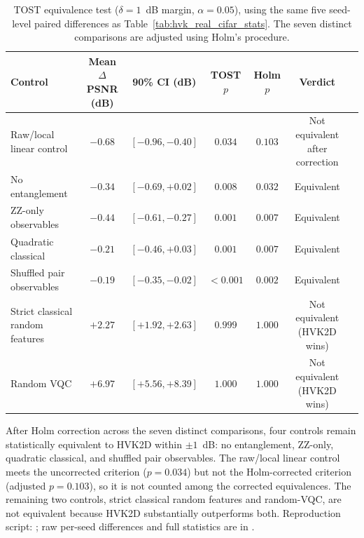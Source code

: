 \documentclass[11pt]{article}
\begin{document}
\begin{table}[H]
\centering
\caption{TOST equivalence test ($\delta=1$~dB margin, $\alpha=0.05$), using the same five seed-level paired differences as Table~\ref{tab:hvk_real_cifar_stats}. The seven distinct comparisons are adjusted using Holm’s procedure.}
\label{tab:tost_equivalence}
\scriptsize
\begin{tabular}{lcccccl}
\toprule
Control & Mean $\Delta$PSNR (dB) & 90\% CI (dB) & TOST $p$ & Holm $p$ & Verdict \\
\midrule
Raw/local linear control & $-0.68$ & $[-0.96,-0.40]$ & $0.034$ & $0.103$ & Not equivalent after correction \\
No entanglement & $-0.34$ & $[-0.69,+0.02]$ & $0.008$ & $0.032$ & Equivalent \\
ZZ-only observables & $-0.44$ & $[-0.61,-0.27]$ & $0.001$ & $0.007$ & Equivalent \\
Quadratic classical & $-0.21$ & $[-0.46,+0.03]$ & $0.001$ & $0.007$ & Equivalent \\
Shuffled pair observables & $-0.19$ & $[-0.35,-0.02]$ & $<0.001$ & $0.002$ & Equivalent \\
Strict classical random features & $+2.27$ & $[+1.92,+2.63]$ & $0.999$ & $1.000$ & Not equivalent (HVK2D wins) \\
Random VQC & $+6.97$ & $[+5.56,+8.39]$ & $1.000$ & $1.000$ & Not equivalent (HVK2D wins) \\
\bottomrule
\end{tabular}
\end{table}

After Holm correction across the seven distinct comparisons, four controls remain statistically equivalent to HVK2D within $\pm1$~dB: no entanglement, ZZ-only, quadratic classical, and shuffled pair observables. The raw/local linear control meets the uncorrected criterion ($p=0.034$) but not the Holm-corrected criterion (adjusted $p=0.103$), so it is not counted among the corrected equivalences. The remaining two controls, strict classical random features and random-VQC, are not equivalent because HVK2D substantially outperforms both. Reproduction script: ; raw per-seed differences and full statistics are in .
\end{document}
